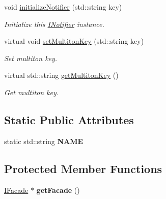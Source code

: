 \begin{DoxyCompactItemize}
\item 
void \hyperlink{class_pure_m_v_c_1_1_notifier_a6910365c70415ba7973401215f57e4af}{initializeNotifier} (std::string key)
\begin{DoxyCompactList}\small\item\em Initialize this \hyperlink{class_pure_m_v_c_1_1_i_notifier}{INotifier} instance. \item\end{DoxyCompactList}\item 
virtual void \hyperlink{class_pure_m_v_c_1_1_multiton_key_heir_abc70ef7c066bc8d7bf0196ec727599bb}{setMultitonKey} (std::string key)
\begin{DoxyCompactList}\small\item\em Set multiton key. \item\end{DoxyCompactList}\item 
virtual std::string \hyperlink{class_pure_m_v_c_1_1_multiton_key_heir_aa5622459d33380deb08dc3cab8b991c7}{getMultitonKey} ()
\begin{DoxyCompactList}\small\item\em Get multiton key. \item\end{DoxyCompactList}\end{DoxyCompactItemize}
\subsection*{Static Public Attributes}
\begin{DoxyCompactItemize}
\item 
\hypertarget{class_pure_m_v_c_1_1_proxy_a285cd604ba2b533b8e8ca1ba4b3a0c36}{
static std::string {\bfseries NAME}}
\label{class_pure_m_v_c_1_1_proxy_a285cd604ba2b533b8e8ca1ba4b3a0c36}

\end{DoxyCompactItemize}
\subsection*{Protected Member Functions}
\begin{DoxyCompactItemize}
\item 
\hypertarget{class_pure_m_v_c_1_1_notifier_a3eeda7190c0c0a2af8d34074df332bbe}{
\hyperlink{class_pure_m_v_c_1_1_i_facade}{IFacade} $\ast$ {\bfseries getFacade} ()}
\label{class_pure_m_v_c_1_1_notifier_a3eeda7190c0c0a2af8d34074df332bbe}

\end{DoxyCompactItemize}
